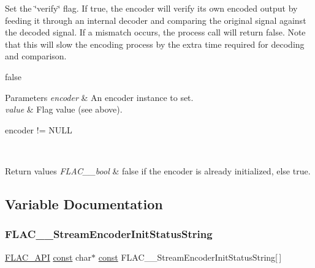 Set the \char`\"{}verify\char`\"{} flag. If {\ttfamily true}, the encoder will verify it\textquotesingle{}s own encoded output by feeding it through an internal decoder and comparing the original signal against the decoded signal. If a mismatch occurs, the process call will return {\ttfamily false}. Note that this will slow the encoding process by the extra time required for decoding and comparison.

{\ttfamily false} 
\begin{DoxyParams}{Parameters}
{\em encoder} & An encoder instance to set. \\
\hline
{\em value} & Flag value (see above).  
\begin{DoxyCode}
encoder != NULL 
\end{DoxyCode}
 \\
\hline
\end{DoxyParams}

\begin{DoxyRetVals}{Return values}
{\em F\+L\+A\+C\+\_\+\+\_\+bool} & {\ttfamily false} if the encoder is already initialized, else {\ttfamily true}. \\
\hline
\end{DoxyRetVals}


\subsection{Variable Documentation}
\mbox{\label{group__flac__stream__encoder_ga05203d2cf0390dfbbc2b57b0f0b8e2df}} 
\subsubsection{\texorpdfstring{F\+L\+A\+C\+\_\+\+\_\+\+Stream\+Encoder\+Init\+Status\+String}{FLAC\_\_StreamEncoderInitStatusString}}
{\footnotesize\ttfamily \hyperlink{group__flac__export_ga56ca07df8a23310707732b1c0007d6f5}{F\+L\+A\+C\+\_\+\+A\+PI} \hyperlink{zconf_8h_a2c212835823e3c54a8ab6d95c652660e}{const} char$\ast$ \hyperlink{zconf_8h_a2c212835823e3c54a8ab6d95c652660e}{const} F\+L\+A\+C\+\_\+\+\_\+\+Stream\+Encoder\+Init\+Status\+String\mbox{[}$\,$\mbox{]}}

